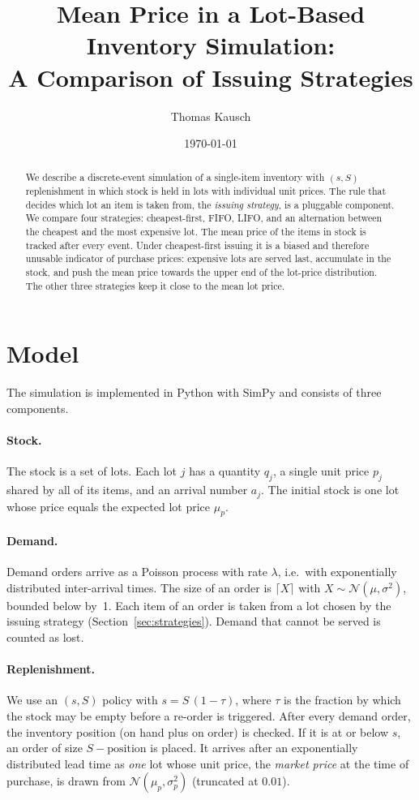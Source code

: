 \documentclass[11pt,a4paper]{article}
\title{Mean Price in a Lot-Based Inventory Simulation:\\
       A Comparison of Issuing Strategies}
\author{Thomas Kausch}
\date{\today}
\begin{document}
\maketitle

\begin{abstract}
We describe a discrete-event simulation of a single-item inventory with
$(s,S)$ replenishment in which stock is held in lots with individual unit
prices. The rule that decides which lot an item is taken from, the
\emph{issuing strategy}, is a pluggable component. We compare four strategies:
cheapest-first, FIFO, LIFO, and an alternation between the cheapest and the
most expensive lot. The mean price of the items in stock is tracked after every
event. Under cheapest-first issuing it is a biased and therefore unusable
indicator of purchase prices: expensive lots are served last, accumulate in the
stock, and push the mean price towards the upper end of the lot-price
distribution. The other three strategies keep it close to the mean lot price.
\end{abstract}

\section{Model}

The simulation is implemented in Python with SimPy and consists of three
components.

\paragraph{Stock.}
The stock is a set of lots. Each lot $j$ has a quantity $q_j$, a single unit
price $p_j$ shared by all of its items, and an arrival number $a_j$. The
initial stock is one lot whose price equals the expected lot price $\mu_p$.

\paragraph{Demand.}
Demand orders arrive as a Poisson process with rate $\lambda$, i.e.\ with
exponentially distributed inter-arrival times. The size of an order is
$\lceil X\rceil$ with $X\sim\mathcal N(\mu,\sigma^2)$, bounded below by~1.
Each item of an order is taken from a lot chosen by the issuing strategy
(Section~\ref{sec:strategies}). Demand that cannot be served is counted as lost.

\paragraph{Replenishment.}
We use an $(s,S)$ policy with $s=S\,(1-\tau)$, where $\tau$ is the fraction
by which the stock may be empty before a re-order is triggered. After every
demand order, the inventory position (on hand plus on order) is checked. If it
is at or below $s$, an order of size $S-\text{position}$ is placed. It arrives
after an exponentially distributed lead time as \emph{one} lot whose unit
price, the \emph{market price} at the time of purchase, is drawn from
$\mathcal N(\mu_p,\sigma_p^2)$ (truncated at $0.01$).
\end{document}

